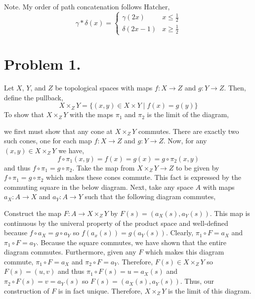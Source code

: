 \documentclass[12pt]{extarticle}
\begin{document}

Note. My order of path concatenation follows Hatcher,
\[\gamma * \delta(x) = \begin{cases}
\gamma(2x) & x \le \tfrac{1}{2} \\
\delta(2x - 1) & x \ge \tfrac{1}{2}
\end{cases}\]
 
\section*{Problem 1.}

Let $X$, $Y$, and $Z$ be topological spaces with maps $f : X \to Z$ and $g : Y \to Z$. Then, define the pullback,
\[ X \times_Z Y = \{ (x, y) \in X \times Y \mid f(x) = g(y) \} \]
To show that $X \times_Z Y$ with the maps $\pi_1$ and $\pi_2$ is the limit of the diagram,
\begin{center}
\end{center}
we first must show that any cone at $X \times_Z Y$ commutes. There are exactly two such cones, one for each map $f : X \to Z$ and $g : Y \to Z$. Now, for any $(x, y) \in X \times_Z Y$ we have, 
\[f \circ \pi_1(x, y) = f(x) = g(x) = g \circ \pi_2(x, y)\]
and thus $f \circ \pi_1 = g \circ \pi_2$. Take the map from $X \times_Z Y \to Z$ to be given by $f \circ \pi_1 = g \circ \pi_2$ which makes these cones commute. This fact is expressed by the commuting square in the below diagram. Next,
take any space $A$ with maps $a_X : A \to X$ and $a_Y : A \to Y$ such that the following diagram commutes,
\begin{center}
\end{center}
Construct the map $F : A \to X \times_Z Y$ by $F(s) = (a_X(s), a_Y(s))$. This map is continuous by the univeral property of the product space and well-defined because $f \circ a_X = g \circ a_Y$ so $f(a_x(s)) = g(a_Y(s))$. Clearly, $\pi_1 \circ F = a_X$ and $\pi_1 \circ F = a_Y$. Because the square commutes, we have shown that the entire diagram commutes. 
Furthermore, given any $F$ which makes this diagram commute, $\pi_1 \circ F = a_X$ and $\pi_2 \circ F = a_Y$. Therefore, $F(s) \in X \times_Z Y$ so $F(s) = (u, v)$ and thus $\pi_1 \circ F(s) = u = a_X(s)$ and $\pi_2 \circ F(s) = v = a_Y(s)$ so $F(s) = (a_X(s), a_Y(s))$. Thus, our construction of $F$ is in fact unique. Therefore, $X \times_Z Y$ is the limit of this diagram. 
\end{document}
